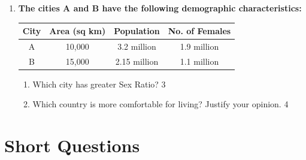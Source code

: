 \documentclass[a4paper,oneside]{book}
\begin{document}
\begin{enumerate}
\begin{enumerate}
    \item
    Determine the Age Specific Birth Rates (ASFR) for the given age groups. \hfill 3

    \item
    Find the General Fertility Rate (GFR) and explain its significance in relation to ASFR. \hfill 4
\end{enumerate}

 \item
	  \textbf{The cities A and B have the following demographic characteristics:} 
  
  \begin{table}[H]
\centering
\begin{tabular}{c|c|c|c}
City & Area (sq km) & Population & No. of Females \\ \hline
A & 10,000 & 3.2 million & 1.9 million \\
B & 15,000 & 2.15 million & 1.1 million
\end{tabular}
\end{table}

  
  \begin{enumerate}
    \item  
	Which city has greater Sex Ratio? \hfill 3
    \item
	Which country is more comfortable  for living? Justify your opinion. \hfill 4
  \end{enumerate}

  
  \end{enumerate}

\section{Short Questions}
\end{document}
